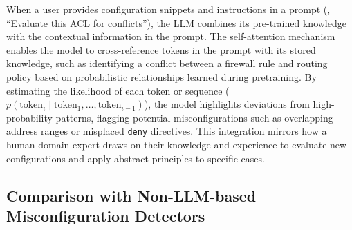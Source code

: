 
 When a user provides configuration snippets and instructions in a prompt (\eg, “Evaluate this ACL for conflicts”), the LLM combines its pre-trained knowledge with the contextual information in the prompt. The self-attention mechanism enables the model to cross-reference tokens in the prompt with its stored knowledge, such as identifying a conflict between a firewall rule and routing policy based on probabilistic relationships learned during pretraining. By estimating the likelihood of each token or sequence (\(p(\text{token}_i \mid \text{token}_1, \ldots, \text{token}_{i-1})\)), the model highlights deviations from high-probability patterns, flagging potential misconfigurations such as overlapping address ranges or misplaced \texttt{deny} directives. This integration mirrors how a human domain expert draws on their knowledge and experience to evaluate new configurations and apply abstract principles to specific cases.



\subsection{Comparison with Non-LLM-based Misconfiguration Detectors}

